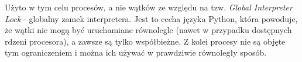 Użyto w tym celu procesów, a nie wątków ze względu na tzw. \emph{Global Interpreter Lock} - globalny zamek interpretera. Jest to cecha języka Python, która powoduje, że wątki nie mogą być uruchamiane równolegle (nawet w przypadku dostępnych rdzeni procesora), a zawsze są tylko współbieżne. Z kolei procesy nie są objęte tym ograniczeniem i można ich używać w prawdziwie równoległy sposób.
